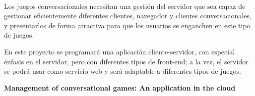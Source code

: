 \chapter*{}






\cleardoublepage
\thispagestyle{empty}

\begin{center}
{\large\bfseries \myTitle}\\
\end{center}
\begin{center}
\myName\\
\end{center}

\\

\vspace{0.7cm}
\\

Los juegos conversacionales necesitan una gestión del servidor que sea capaz de gestionar eficientemente diferentes clientes, navegador y clientes conversacionales, y presentarlos de forma atractiva para que los usuarios se enganchen en este tipo de juegos.

En este proyecto se programará una aplicación cliente-servidor, con especial énfasis en el servidor, pero con diferentes tipos de front-end; a la vez, el servidor se podrá usar como servicio web y será adaptable a diferentes tipos de juegos.
\cleardoublepage


\thispagestyle{empty}


\begin{center}
{\large\bfseries Management of conversational games: An application in the cloud}\\
\end{center}
\begin{center}
\myName\\
\end{center}

\\

